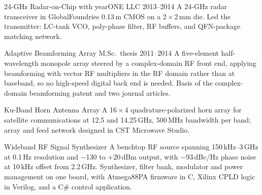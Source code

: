 \begin{cventries}

    \cventry
        {24-GHz Radar-on-Chip}
        {with yearONE LLC}
        {}
        {2013--2014}
        {{\cvdescfont A 24-GHz radar transceiver in GlobalFoundries 0.13\,\textmu m CMOS on a 2\,$\times$\,2\,mm die. Led the transmitter: LC-tank VCO, poly-phase filter, RF buffers, and QFN-package matching network.}}

    \cventry
        {Adaptive Beamforming Array}
        {M.Sc.\ thesis}
        {}
        {2011--2014}
        {{\cvdescfont A five-element half-wavelength monopole array steered by a complex-domain RF front end, applying beamforming with vector RF multipliers in the RF domain rather than at baseband, so no high-speed digital back end is needed. Basis of the complex-domain beamforming patent and two journal articles.}}

    \cventry
        {Ku-Band Horn Antenna Array}
        {}
        {}
        {}
        {{\cvdescfont A 16\,$\times$\,4 quadrature-polarized horn array for satellite communications at 12.5 and 14.25\,GHz, 500\,MHz bandwidth per band; array and feed network designed in CST Microwave Studio.}}

    \cventry
        {Wideband RF Signal Synthesizer}
        {}
        {}
        {}
        {{\cvdescfont A benchtop RF source spanning 150\,kHz--3\,GHz at 0.1\,Hz resolution and $-$130 to $+$20\,dBm output, with $-$93\,dBc/Hz phase noise at 10\,kHz offset from 2.2\,GHz. Synthesizer, filter bank, modulator and power management on one board, with Atmega88PA firmware in C, Xilinx CPLD logic in Verilog, and a C\# control application.}}

\end{cventries}
